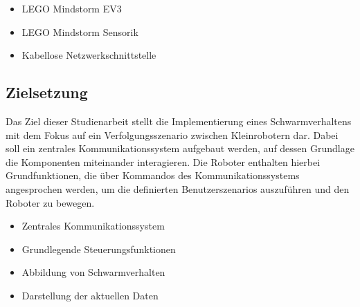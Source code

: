 \begin{itemize}
	\item LEGO Mindstorm EV3
	\item LEGO Mindstorm Sensorik
	\item Kabellose Netzwerkschnittstelle
\end{itemize}

\subsection{Zielsetzung}

Das Ziel dieser Studienarbeit stellt die Implementierung eines Schwarmverhaltens mit dem Fokus auf ein Verfolgungsszenario zwischen Kleinrobotern dar. Dabei soll ein zentrales Kommunikationssystem aufgebaut werden, auf dessen Grundlage die Komponenten miteinander interagieren. Die Roboter enthalten hierbei Grundfunktionen, die über Kommandos des Kommunikationssystems angesprochen werden, um die definierten Benutzerszenarios auszuführen und den Roboter zu bewegen.

\begin{itemize}
	\item Zentrales Kommunikationssystem
	\item Grundlegende Steuerungsfunktionen
	\item Abbildung von Schwarmverhalten
	\item Darstellung der aktuellen Daten
\end{itemize}

\begin{comment}
	\subsection{Erwartetes Ergebnis}
	
	Erwartet wird ein Ergebnis, indem der Nutzer des Systems über eine mobile App mithilfe einer zentralen STeuereinheit einen beliebigen Kontext für ein ausgewähltes Schwarmverhalten starten kann. Dabei soll eine abstrakte IMplementierung beachtet werden, indem verschiedene RObotertypen und Szenarien für Schwarmverhalten dargestellt sind, um wenn erwünscht ein komplexes Szanrio mit unterschiedlichen RObotern zu starten um definierte AUfgaben zu lösen. Dabei ist vor allem die Implementierung der Grundsteuerung mitsammt der Kommunikation des Systems entscheident.
\end{comment}